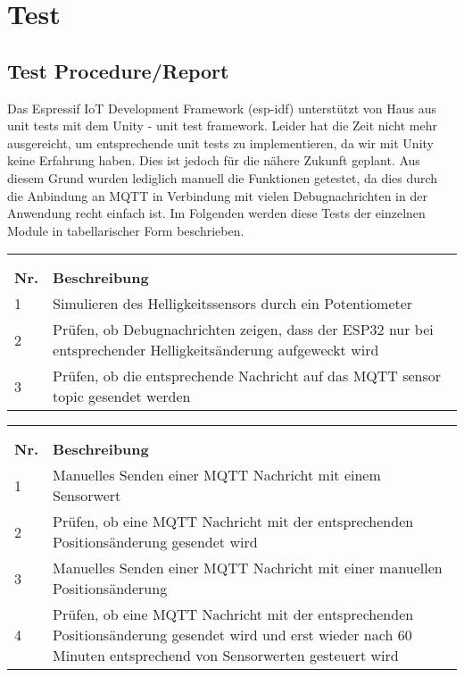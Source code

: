 \chapter{Test}
\label{cha:Test}

\section{Test Procedure/Report}
Das Espressif IoT Development Framework (esp-idf) unterstützt von Haus aus unit tests mit dem Unity - unit test framework. Leider hat die Zeit nicht mehr ausgereicht, um entsprechende unit tests zu implementieren, da wir mit Unity keine Erfahrung haben. Dies ist jedoch für die nähere Zukunft geplant. Aus diesem Grund wurden lediglich manuell die Funktionen getestet, da dies durch die Anbindung an MQTT in Verbindung mit vielen Debugnachrichten in der Anwendung recht einfach ist. Im Folgenden werden diese Tests der einzelnen Module in tabellarischer Form beschrieben.


\begin{longtable}[ht]{p{}  p{}}
	\captionabove[Test Sensor Module]{Test Sensor Module}\\
	\label{tab:sensortest}\\
	\toprule
	\rowcolor[HTML]{FFFC9E} 
	{\color[HTML]{333333} \textbf{Nr.}} & {\color[HTML]{333333} \textbf{Beschreibung}} \\* \midrule
	\endhead
	1 & Simulieren des Helligkeitssensors durch ein Potentiometer\\* \midrule
	2 & Prüfen, ob Debugnachrichten zeigen, dass der ESP32 nur bei entsprechender Helligkeitsänderung aufgeweckt wird\\* \midrule
	3 & Prüfen, ob die entsprechende Nachricht auf das MQTT sensor topic gesendet werden \\*
	\bottomrule
\end{longtable}

\begin{longtable}[ht]{p{}  p{}}
	\captionabove[Test Regler Module]{Test Regler Module}\\
	\label{tab:reglertest}\\
	\toprule
	\rowcolor[HTML]{FFFC9E} 
	{\color[HTML]{333333} \textbf{Nr.}} & {\color[HTML]{333333} \textbf{Beschreibung}} \\* \midrule
	\endhead
	1 & Manuelles Senden einer MQTT Nachricht mit einem Sensorwert\\* \midrule
	2 & Prüfen, ob eine MQTT Nachricht mit der entsprechenden Positionsänderung gesendet wird\\* \midrule
	3 & Manuelles Senden einer MQTT Nachricht mit einer manuellen Positionsänderung\\* \midrule
	4 & Prüfen, ob eine MQTT Nachricht mit der entsprechenden Positionsänderung gesendet wird und erst wieder nach 60 Minuten entsprechend von Sensorwerten gesteuert wird\\*
	\bottomrule
\end{longtable}

